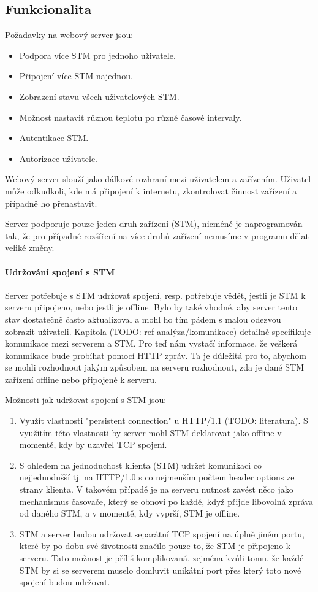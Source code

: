 
\subsection{Funkcionalita}
Požadavky na webový server jsou:
\begin{itemize}
  \item Podpora více STM pro jednoho uživatele.
  \item Připojení více STM najednou.
  \item Zobrazení stavu všech uživatelových STM.
  \item Možnost nastavit různou teplotu po různé časové intervaly.
  \item Autentikace STM.
  \item Autorizace uživatele.
\end{itemize}
Webový server slouží jako dálkové rozhraní mezi uživatelem a zařízením.
Uživatel může odkudkoli, kde má připojení k internetu, zkontrolovat činnost zařízení
a případně ho přenastavit.

Server podporuje pouze jeden druh zařízení (STM), nicméně je naprogramován
tak, že pro případné rozšíření na více druhů zařízení nemusíme v programu dělat veliké
změny.

\paragraph{Udržování spojení s STM}
Server potřebuje s STM udržovat spojení, resp. potřebuje vědět, jestli je STM k serveru připojeno,
nebo jestli je offline.
Bylo by také vhodné, aby server tento stav dostatečně často aktualizoval a mohl ho tím pádem s malou
odezvou zobrazit uživateli.
Kapitola (TODO: ref analýza/komunikace) detailně specifikuje komunikace mezi serverem a STM.
Pro teď nám vystačí informace, že veškerá komunikace bude probíhat pomocí HTTP zpráv.
Ta je důležitá pro to, abychom se mohli rozhodnout jakým způsobem na serveru rozhodnout, zda je dané
STM zařízení offline nebo připojené k serveru.

Možnosti jak udržovat spojení s STM jsou:
\begin{enumerate}
  \item Využít vlastnosti "persistent connection" u HTTP/1.1 (TODO: literatura).
    S využitím této vlastnosti by server mohl STM deklarovat jako offline v momentě, kdy by uzavřel
    TCP spojení.
  \item S ohledem na jednoduchost klienta (STM) udržet komunikaci co nejjednodušší tj.
    na HTTP/1.0 s co nejmenším počtem header options ze strany klienta.
    V takovém případě je na serveru nutnost zavést něco jako mechanismus časovače, který se obnoví po každé,
    když přijde libovolná zpráva od daného STM, a v momentě, kdy vyprší, STM je offline.
  \item STM a server budou udržovat separátní TCP spojení na úplně jiném portu, které
    by po dobu své životnosti značilo pouze to, že STM je připojeno k serveru.
    Tato možnost je příliš komplikovaná, zejména kvůli tomu, že každé STM by si se serverem muselo domluvit
    unikátní port přes který toto nové spojení budou udržovat.
\end{enumerate}

